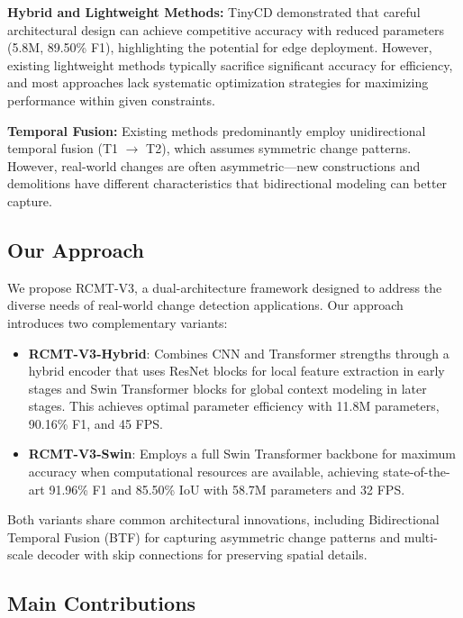 \documentclass[journal]{IEEEtran}
\begin{document}
{\textbf{Hybrid and Lightweight Methods:} TinyCD \cite{tinycd} demonstrated that careful architectural design can achieve competitive accuracy with reduced parameters (5.8M, 89.50\% F1), highlighting the potential for edge deployment. However, existing lightweight methods typically sacrifice significant accuracy for efficiency, and most approaches lack systematic optimization strategies for maximizing performance within given constraints.

\textbf{Temporal Fusion:} Existing methods predominantly employ unidirectional temporal fusion (T1 $\rightarrow$ T2), which assumes symmetric change patterns. However, real-world changes are often asymmetric—new constructions and demolitions have different characteristics that bidirectional modeling can better capture.

\subsection{Our Approach}

We propose RCMT-V3, a dual-architecture framework designed to address the diverse needs of real-world change detection applications. Our approach introduces two complementary variants:

\begin{itemize}
\item \textbf{RCMT-V3-Hybrid}: Combines CNN and Transformer strengths through a hybrid encoder that uses ResNet blocks for local feature extraction in early stages and Swin Transformer blocks for global context modeling in later stages. This achieves optimal parameter efficiency with 11.8M parameters, 90.16\% F1, and 45 FPS.

\item \textbf{RCMT-V3-Swin}: Employs a full Swin Transformer backbone for maximum accuracy when computational resources are available, achieving state-of-the-art 91.96\% F1 and 85.50\% IoU with 58.7M parameters and 32 FPS.
\end{itemize}

Both variants share common architectural innovations, including Bidirectional Temporal Fusion (BTF) for capturing asymmetric change patterns and multi-scale decoder with skip connections for preserving spatial details.

\subsection{Main Contributions}

}
\end{document}
